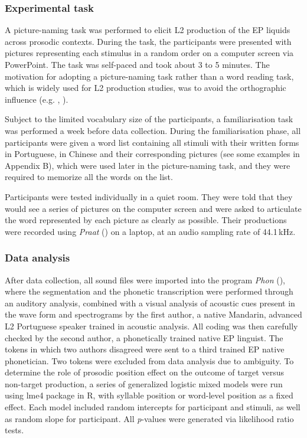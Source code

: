 \documentclass[output=paper]{../langscibook}
\begin{document}
\subsubsection{Experimental task}


A picture-naming task was performed to elicit L2 production of the EP liquids across prosodic contexts. During the task, the participants were presented with pictures representing each stimulus in a random order on a computer screen via PowerPoint. The task was self-paced and took about 3 to 5 minutes. The motivation for adopting a picture-naming task rather than a word reading task, which is widely used for L2 production studies, was to avoid the orthographic influence (e.g. \citealt{Hayes-HarbMasuda2008}, \citealt{EscuderoWanrooij2010}).

Subject to the limited vocabulary size of the participants, a familiarisation task was performed a week before data collection. During the familiarisation phase, all participants were given a word list containing all stimuli with their written forms in Portuguese, in Chinese and their corresponding pictures (see some examples in Appendix B), which were used later in the picture-naming task, and they were required to memorize all the words on the list.

Participants were tested individually in a quiet room. They were told that they would see a series of pictures on the computer screen and were asked to articulate the word represented by each picture as clearly as possible. Their productions were recorded using \textit{Praat} (\citealt{BoersmaWeenink2016}) on a laptop, at an audio sampling rate of 44.1\,kHz.


\subsubsection{Data analysis}


After data collection, all sound files were imported into the program \textit{Phon} (\citealt{RoseMacwhinney2014}), where the segmentation and the phonetic transcription were performed through an auditory analysis, combined with a visual analysis of acoustic cues present in the wave form and spectrograms by the first author, a native Mandarin, advanced L2 Portuguese speaker trained in acoustic analysis. All coding was then carefully checked by the second author, a phonetically trained native EP linguist. The tokens in which two authors disagreed were sent to a third trained EP native phonetician. Two tokens were excluded from data analysis due to ambiguity. To determine the role of prosodic position effect on the outcome of target versus non-target production, a series of generalized logistic mixed models were run using lme4 package \citep{BatesEtAl2015} in R, with syllable position or word-level position as a fixed effect. Each model included random intercepts for participant and stimuli, as well as random slope for participant. All \textit{p}{}-values were generated via likelihood ratio tests.
\end{document}
